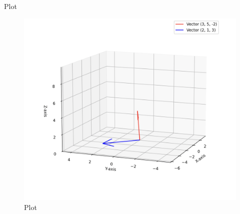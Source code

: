 \documentclass{beamer}
\begin{document}
\begin{frame}{Plot}
\begin{figure}
    \centering
    \includegraphics[width=0.8\columnwidth]{Figs/Figure_4.png}
    \caption{Plot}
    \label{fig:placeholder}
\end{figure}
\end{frame}
\end{document}
